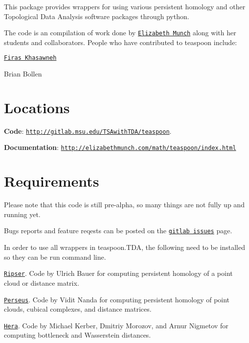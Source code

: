 This package provides wrappers for using various persistent homology and other Topological Data Analysis software packages through python.

The code is an compilation of work done by \href{http://www.elizabethmunch.com/math}{\tt Elizabeth Munch} along with her students and collaborators. People who have contributed to teaspoon include\+:


\begin{DoxyItemize}
\item \href{http://www.firaskhasawneh.com}{\tt Firas Khasawneh}
\item Brian Bollen
\end{DoxyItemize}

\section*{Locations }


\begin{DoxyItemize}
\item {\bfseries Code}\+: \href{https://gitlab.msu.edu/TSAwithTDA/teaspoon}{\tt http\+://gitlab.\+msu.\+edu/\+T\+S\+Awith\+T\+D\+A/teaspoon}.
\item {\bfseries Documentation}\+: \href{http://elizabethmunch.com/math/teaspoon/index.html}{\tt http\+://elizabethmunch.\+com/math/teaspoon/index.\+html}
\end{DoxyItemize}

\section*{Requirements }

Please note that this code is still pre-\/alpha, so many things are not fully up and running yet.

Bugs reports and feature reqests can be posted on the \href{https://gitlab.msu.edu/TSAwithTDA/teaspoon/issues}{\tt gitlab issues} page.

In order to use all wrappers in teaspoon.\+T\+DA, the following need to be installed so they can be run command line.


\begin{DoxyItemize}
\item \href{https://github.com/Ripser/ripser}{\tt Ripser}. Code by Ulrich Bauer for computing persistent homology of a point cloud or distance matrix.
\item \href{http://people.maths.ox.ac.uk/nanda/perseus/index.html}{\tt Perseus}. Code by Vidit Nanda for computing persistent homology of point clouds, cubical complexes, and distance matrices.
\item \href{https://bitbucket.org/grey_narn/hera}{\tt Hera}. Code by Michael Kerber, Dmitriy Morozov, and Arnur Nigmetov for computing bottleneck and Wasserstein distances.
\end{DoxyItemize}

